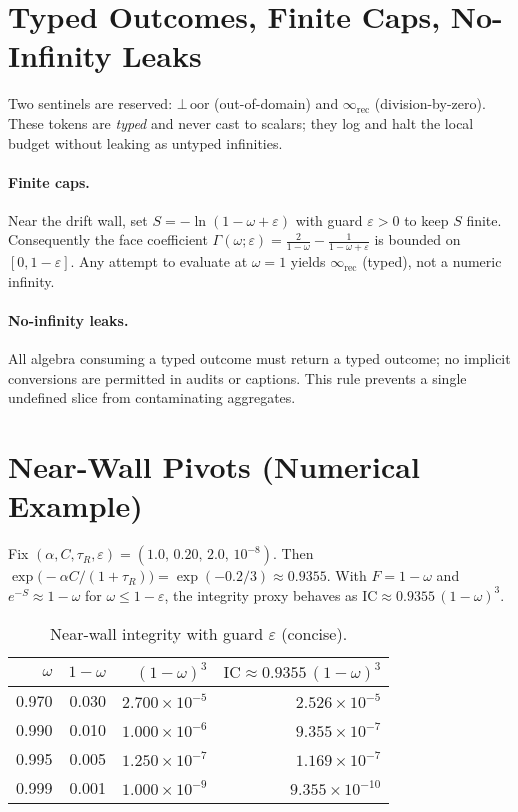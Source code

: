 \section{Typed Outcomes, Finite Caps, No-Infinity Leaks}
\begin{definition}
Two sentinels are reserved: \(\bot\,\mathrm{oor}\) (out-of-domain) and \(\infty_{\mathrm{rec}}\) (division-by-zero).
These tokens are \emph{typed} and never cast to scalars; they log and halt the local budget without leaking as untyped infinities.
\end{definition}

\paragraph{Finite caps.}
Near the drift wall, set \(S=-\ln(1-\omega+\varepsilon)\) with guard \(\varepsilon>0\) to keep \(S\) finite.
Consequently the face coefficient \(\Gamma(\omega;\varepsilon)=\tfrac{2}{1-\omega}-\tfrac{1}{1-\omega+\varepsilon}\) is bounded on \([0,1-\varepsilon]\).
Any attempt to evaluate at \(\omega=1\) yields \(\infty_{\mathrm{rec}}\) (typed), not a numeric infinity.

\paragraph{No-infinity leaks.}
All algebra consuming a typed outcome must return a typed outcome; no implicit conversions are permitted in audits or captions.
This rule prevents a single undefined slice from contaminating aggregates.

\section{Near-Wall Pivots (Numerical Example)}
Fix \((\alpha,C,\tau_{R},\varepsilon)=(1.0,\,0.20,\,2.0,\,10^{-8})\).
Then \(\exp\!\bigl(-\alpha C/(1+\tau_{R})\bigr)=\exp(-0.2/3)\approx 0.9355\).
With \(F=1-\omega\) and \(e^{-S}\approx 1-\omega\) for \(\omega\le 1-\varepsilon\), the integrity proxy behaves as
\(\mathrm{IC}\approx 0.9355\,(1-\omega)^3\).

\begin{table}[h]
  \centering
  \caption{Near-wall integrity with guard \(\varepsilon\) (concise).}
  \begin{tabular}{@{} r r r r @{}}
    \toprule
    $\omega$ & $1-\omega$ & $(1-\omega)^3$ & $\mathrm{IC}\approx 0.9355\,(1-\omega)^3$ \\
    \midrule
    0.970  & 0.030  & \(2.700\times 10^{-5}\) & \(2.526\times 10^{-5}\) \\
    0.990  & 0.010  & \(1.000\times 10^{-6}\) & \(9.355\times 10^{-7}\) \\
    0.995  & 0.005  & \(1.250\times 10^{-7}\) & \(1.169\times 10^{-7}\) \\
    0.999  & 0.001  & \(1.000\times 10^{-9}\) & \(9.355\times 10^{-10}\) \\
    \bottomrule
  \end{tabular}
\end{table}

